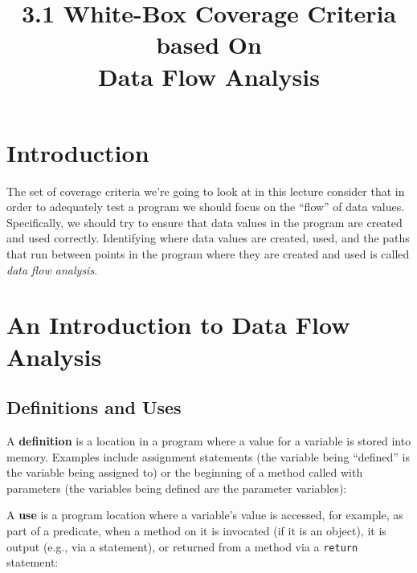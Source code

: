 



\title{3.1 White-Box Coverage Criteria based On \\ Data Flow Analysis}

\section{Introduction}

The set of coverage criteria we're going to look at in this lecture consider
that in order to adequately test a program we should focus on the ``flow'' of
data values. Specifically, we should try to ensure that data values in the
program are created and used correctly. Identifying where data values are
created, used, and the paths that run between points in the program where they
are created and used is called {\it data flow analysis}. 

\section{An Introduction to Data Flow Analysis}

\subsection{Definitions and Uses}

A {\bf definition} is a location in a program where a value for a variable is
stored into memory. Examples include assignment statements (the variable being
``defined'' is the variable being assigned to) or the beginning of a method called
with parameters (the variables being defined are the parameter variables):

\begin{center} 
\end{center}   

A {\bf use} is a program location where a variable's value is accessed, for
example, as part of a predicate, when a method on it is invocated (if it is an
object), it is output (e.g., via a  statement), or
returned from a method via a {\tt return} statement:

\begin{center} 
\end{center}  


